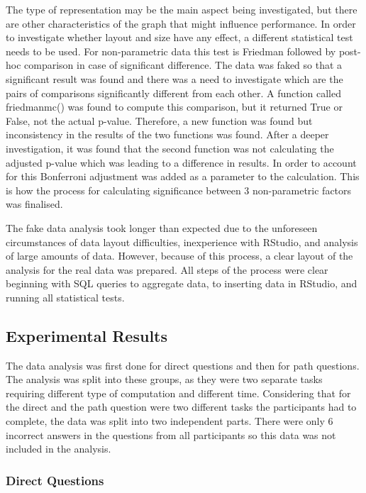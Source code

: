\documentclass{l4proj}
\begin{document}
The type of representation may be the main aspect being investigated, but there are other characteristics of the graph that might influence performance. In order to investigate whether layout and size have any effect, a different statistical test needs to be used. For non-parametric data this test is Friedman followed by post-hoc comparison in case of significant difference. The data was faked so that a significant result was found and there was a need to investigate which are the pairs of comparisons significantly different from each other. A function called friedmanmc() was found to compute this comparison, but it returned True or False, not the actual p-value. Therefore, a new function was found but inconsistency in the results of the two functions was found. After a deeper investigation, it was found that the second function was not calculating the adjusted p-value which was leading to a difference in results. In order to account for this Bonferroni adjustment was added as a parameter to the calculation. This is how the process for calculating significance between 3  non-parametric factors was finalised. 

The fake data analysis took longer than expected due to the unforeseen circumstances of data layout difficulties, inexperience with RStudio, and analysis of large amounts of data. However, because of this process, a clear layout of the analysis for the real data was prepared. All steps of the process were clear beginning with SQL queries to aggregate data, to inserting data in RStudio, and running all statistical tests.

\subsection{Experimental Results}

The data analysis was first done for direct questions and then for path questions. The analysis was split into these groups, as they were two separate tasks requiring different type of computation and different time. Considering that for the direct and the path question were two different tasks the participants had to complete, the data was split into two independent parts. There were only 6 incorrect answers in the questions from all participants so this data was not included in the analysis.

\subsubsection{Direct Questions}
\end{document}

